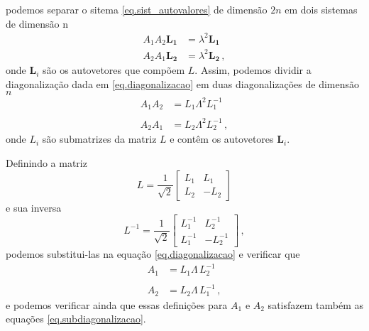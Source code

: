 podemos separar o sitema \ref{eq.sist_autovalores} de dimens\~ao $2n$ em dois sistemas de dimens\~ao n
\begin{align*}
A_1A_2\mathbf{L_1}&=\lambda^2\mathbf{L_1}\\
A_2A_1\mathbf{L_2}&=\lambda^2\mathbf{L_2}\,,
\end{align*}
onde $\mathbf{L}_i$ s\~ao os autovetores que comp\~oem $L$.
Assim, podemos dividir a diagonaliza\c{c}\~ao dada em \ref{eq.diagonalizacao} em duas diagonaliza\c{c}\~oes de dimens\~ao $n$
\begin{align}\label{eq.subdiagonalizacao}\nonumber
A_1A_2&=L_1\Lambda^2L_1^{-1}\\\quad\\\nonumber
A_2A_1&=L_2\Lambda^2L_2^{-1}\,,
\end{align}
onde $L_i$ s\~ao submatrizes da matriz $L$ e cont\^em os autovetores $\mathbf{L}_i$.



Definindo a matriz 
\begin{equation}\label{eq.L}
L=\frac{1}{\sqrt{2}}
\begin{bmatrix}
L_1&L_1\\
L_2&-L_2
\end{bmatrix}
\end{equation}
e sua inversa
\begin{equation}\label{eq.L_inversa}
L^{-1}=\frac{1}{\sqrt{2}}
\begin{bmatrix}
L_1^{-1}&L_2^{-1}\\
L_1^{-1}&-L_2^{-1}
\end{bmatrix}\,,
\end{equation}
podemos substitui-las na equa\c{c}\~ao \ref{eq.diagonalizacao} e verificar que 
\begin{align}\label{eq.definicao_A1_A2}\nonumber
A_1&=L_1\Lambda\,L_2^{-1}\\\quad\\\nonumber
A_2&=L_2\Lambda\,L_1^{-1}\,,
\end{align}
e podemos verificar ainda que essas defini\c{c}\~oes para $A_1$ e $A_2$ satisfazem tamb\'em as equa\c{c}\~oes \ref{eq.subdiagonalizacao}.

